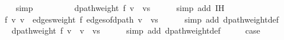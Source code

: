 \begin{isabellebody}
\ \ \ \ \isamarkupfalse%
\ simp\isanewline
\ \ \isamarkupfalse%
\ \isamarkupfalse%
\ {\isachardoublequoteopen}{\isachardot}{\kern0pt}{\isachardot}{\kern0pt}{\isachardot}{\kern0pt}\ {\isacharequal}{\kern0pt}\ {}\ {\isacharplus}{\kern0pt}\ dpath{\isacharunderscore}{\kern0pt}weight\ {\isacharquery}{\kern0pt}f\ {\isacharparenleft}{\kern0pt}v{\isacharprime}{\kern0pt}\ {\isacharhash}{\kern0pt}\ vs{\isacharparenright}{\kern0pt}{\isachardoublequoteclose}\isanewline
\ \ \ \ \isamarkupfalse%
\ {\isacharparenleft}{\kern0pt}simp\ add{\isacharcolon}{\kern0pt}\ {\isachardoublequoteopen}{}{\isachardot}{\kern0pt}IH{\isachardoublequoteclose}{\isacharparenright}{\kern0pt}\isanewline
\ \ \isamarkupfalse%
\ \isamarkupfalse%
\ {\isachardoublequoteopen}{\isachardot}{\kern0pt}{\isachardot}{\kern0pt}{\isachardot}{\kern0pt}\ {\isacharequal}{\kern0pt}\ {\isacharquery}{\kern0pt}f\ {\isacharparenleft}{\kern0pt}v{\isacharcomma}{\kern0pt}\ v{\isacharprime}{\kern0pt}{\isacharparenright}{\kern0pt}\ {\isacharplus}{\kern0pt}\ edges{\isacharunderscore}{\kern0pt}weight\ {\isacharquery}{\kern0pt}f\ {\isacharparenleft}{\kern0pt}edges{\isacharunderscore}{\kern0pt}of{\isacharunderscore}{\kern0pt}dpath\ {\isacharparenleft}{\kern0pt}v{\isacharprime}{\kern0pt}\ {\isacharhash}{\kern0pt}\ vs{\isacharparenright}{\kern0pt}{\isacharparenright}{\kern0pt}{\isachardoublequoteclose}\isanewline
\ \ \ \ \isamarkupfalse%
\ {\isacharparenleft}{\kern0pt}simp\ add{\isacharcolon}{\kern0pt}\ dpath{\isacharunderscore}{\kern0pt}weight{\isacharunderscore}{\kern0pt}def{\isacharparenright}{\kern0pt}\isanewline
\ \ \isamarkupfalse%
\ \isamarkupfalse%
\ {\isachardoublequoteopen}{\isachardot}{\kern0pt}{\isachardot}{\kern0pt}{\isachardot}{\kern0pt}\ {\isacharequal}{\kern0pt}\ dpath{\isacharunderscore}{\kern0pt}weight\ {\isacharquery}{\kern0pt}f\ {\isacharparenleft}{\kern0pt}v\ {\isacharhash}{\kern0pt}\ v{\isacharprime}{\kern0pt}\ {\isacharhash}{\kern0pt}\ vs{\isacharparenright}{\kern0pt}{\isachardoublequoteclose}\isanewline
\ \ \ \ \isamarkupfalse%
\ {\isacharparenleft}{\kern0pt}simp\ add{\isacharcolon}{\kern0pt}\ dpath{\isacharunderscore}{\kern0pt}weight{\isacharunderscore}{\kern0pt}def{\isacharparenright}{\kern0pt}\isanewline
\ \ \isamarkupfalse%
\ \isamarkupfalse%
\ {\isacharquery}{\kern0pt}case\isanewline
\ \ \ \ \isacommand{{\isachardot}{\kern0pt}}\isamarkupfalse%
\isanewline
{}\isamarkupfalse%
%
\endisatagproof
{\isafoldproof}%
%
\isadelimproof
\isanewline
%
\endisadelimproof
%
\isadeliminvisible
\isanewline
%
\endisadeliminvisible
%
\isataginvisible
{}\isamarkupfalse%
%
\endisataginvisible
{\isafoldinvisible}%
%
\isadeliminvisible
%
\endisadeliminvisible
%
\end{isabellebody}%
